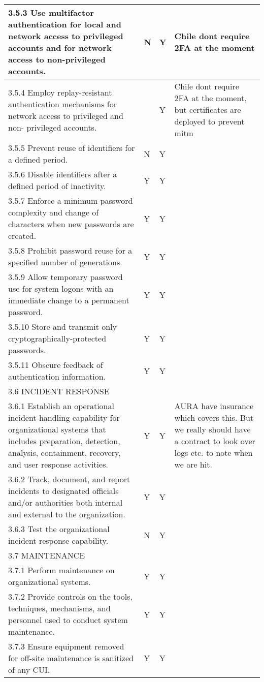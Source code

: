 \begin{longtable} {|p{}|p{}|p{}|p{} |}
{3.5.3 Use multifactor authentication for local and network access to privileged accounts and for network access to non-privileged accounts.}&{N}&{Y}&{Chile dont require 2FA at the moment} \\ \hline
{3.5.4 Employ replay-resistant authentication mechanisms for network access to privileged and non- privileged accounts.}&{}&{Y}&{Chile dont require 2FA at the moment, but certificates are deployed to prevent mitm} \\ \hline
{3.5.5 Prevent reuse of identifiers for a defined period.}&{N}&{Y}& \\ \hline
{3.5.6 Disable identifiers after a defined period of inactivity.}&{Y}&{Y}& \\ \hline
{3.5.7 Enforce a minimum password complexity and change of characters when new passwords are created.}&{Y}&{Y}& \\ \hline
{3.5.8 Prohibit password reuse for a specified number of generations.}&{Y}&{Y}& \\ \hline
{3.5.9 Allow temporary password use for system logons with an immediate change to a permanent password.}&{Y}&{Y}& \\ \hline
{3.5.10 Store and transmit only cryptographically-protected passwords.}&{Y}&{Y}& \\ \hline
{3.5.11 Obscure feedback of authentication information.}&{Y}&{Y}& \\ \hline
{3.6 INCIDENT RESPONSE}&&& \\ \hline
{3.6.1 Establish an operational incident-handling capability for organizational systems that includes preparation, detection, analysis, containment, recovery, and user response activities.}&{Y}&{Y}&{AURA have insurance which covers this. But we really should have a contract to look over logs etc. to note when we are hit.} \\ \hline
{3.6.2 Track, document, and report incidents to designated officials and/or authorities both internal and external to the organization.}&{Y}&{Y}& \\ \hline
{3.6.3 Test the organizational incident response capability.}&{N}&{Y}& \\ \hline
{3.7 MAINTENANCE}&&& \\ \hline
{3.7.1 Perform maintenance on organizational systems.}&{Y}&{Y}& \\ \hline
{3.7.2 Provide controls on the tools, techniques, mechanisms, and personnel used to conduct system maintenance.}&{Y}&{Y}& \\ \hline
{3.7.3 Ensure equipment removed for off-site maintenance is sanitized of any CUI.}&{Y}&{Y}& \\ \hline

\end{longtable}

